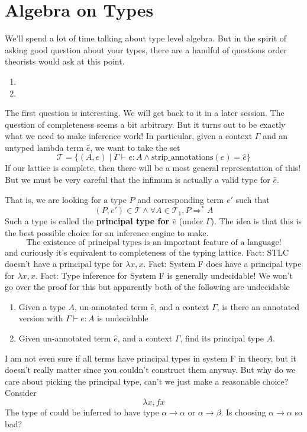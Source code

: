 \documentclass[12pt]{article}
\begin{document}
\section{Algebra on Types}
We'll spend a lot of time talking about type level algebra.
But in the spirit of asking good question about your types, there are a handful of questions order theorists would ask at this point.
\begin{enumerate}
    \item {}
    \item {}
\end{enumerate}
The first question is interesting. We will get back to it in a later session.
The question of completeness seems a bit arbitrary.
But it turns out to be exactly what we need to make inference work!
In particular, given a context $\Gamma$ and an untyped lambda term $\hat{e}$, we want to take the set 
\[
  \mathcal{T} = \{(A,e) \;|\; \Gamma \vdash e : A \land \text{strip\_annotations}(e) = \hat{e} \}
\]
If our lattice is complete, then there will be a most general representation of this!
But we must be very careful that the infimum is actually a valid type for $\hat{e}$.

That is, we are looking for a type $P$ and corresponding term $e'$ such that 
\[
  (P,e') \in \mathcal{T} \land \forall A \in \mathcal{T}_1, P \Rightarrow^* A
\]
Such a type is called the \textbf{principal type for $\hat{e}$} (under $\Gamma$).
The idea is that this is the best possible choice for an inference engine to make.
\[
\text{The existence of principal types is an important feature of a language!}
\]
and curiously it's equivalent to completeness of the typing lattice. 
Fact: STLC doesn't have a principal type for $\lambda x, x$. 
Fact: System F does have a principal type for $\lambda x, x$.
Fact: Type inference for System F is generally undecidable!
We won't go over the proof for this but apparently both of the following are undecidable
\begin{enumerate}
    \item Given a type $A$, un-annotated term $\hat{e}$, and a context $\Gamma$, is there an annotated version with $\Gamma \vdash e : A$ is undecidable
    \item Given un-annotated term $\hat{e}$, and a context $\Gamma$, find its principal type $A$. 
\end{enumerate}
I am not even sure if all terms have principal types in system F in theory, but it doesn't really matter since you couldn't construct them anyway.
But why do we care about picking the principal type, can't we just make a reasonable choice?
Consider
\[
  \lambda x, f x 
\]
The type of could be inferred to have type $\alpha \rightarrow \alpha$ or $\alpha \rightarrow \beta$.
Is choosing $\alpha \rightarrow \alpha$ so bad?
\end{document}
